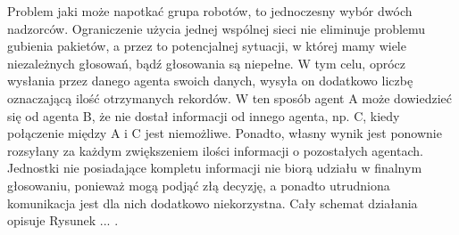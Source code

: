 Problem jaki może napotkać grupa robotów, to jednoczesny wybór dwóch nadzorców. Ograniczenie użycia jednej wspólnej sieci nie eliminuje problemu gubienia pakietów, a przez to potencjalnej sytuacji, w której mamy wiele niezależnych głosowań, bądź głosowania są niepełne. W tym celu, oprócz wysłania przez danego agenta swoich danych, wysyła on dodatkowo liczbę oznaczającą ilość otrzymanych rekordów. W ten sposób agent A może dowiedzieć się od agenta B, że nie dostał informacji od innego agenta, np. C, kiedy połączenie między A i C jest niemożliwe. Ponadto, własny wynik jest ponownie rozsyłany za każdym zwiększeniem ilości informacji o pozostałych agentach. Jednostki nie posiadające kompletu informacji nie biorą udziału w finalnym głosowaniu, ponieważ mogą podjąć złą decyzję, a ponadto utrudniona komunikacja jest dla nich dodatkowo niekorzystna. Cały schemat działania opisuje Rysunek ... .

